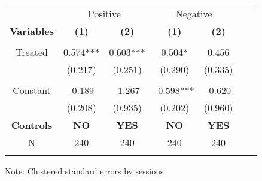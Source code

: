  \begin{table}[htbp]
    \begin{tabular}{c c c c c c c }
    \toprule
    &\multicolumn{2}{c}{Positive}         &\multicolumn{2}{c}{Negative}      \\

    \textbf{Variables} & \textbf{(1)} & \textbf{(2)}  & \textbf{(1)} & \textbf{(2)}              \\ 

    \textbf & \textbf & \textbf  & \textbf & \textbf \\ 

    \midrule
     Treated           &  0.574***   & 0.603***    & 0.504*     & 0.456  \\
                       & (0.217)     & (0.251)     & (0.290)    & (0.335)   \\
                       &             &             &            &                  \\

    Constant           &  -0.189     &  -1.267     & -0.598***  & -0.620             \\
                       &  (0.208)    &  (0.935)    & (0.202)    & (0.960)            \\
   
\midrule
    
\textbf{Controls} & \textbf{ NO } & \textbf{YES}  & \textbf{ NO } & \textbf{YES}  \\ 
    \midrule
     N                  &   240          &      240  &     240  &     240        \\          
    \bottomrule
    \addlinespace[1ex]
    \multicolumn{3}{l}{\textsuperscript{***}$p<0.01$, 
      \textsuperscript{**}$p<0.05$, 
      \textsuperscript{*}$p<0.1$}
    \end{tabular}
    \newline
    Note: Clustered standard errors by sessions
\end{table}

